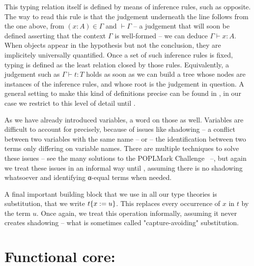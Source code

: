 \begin{marginfigure}
  \begin{mathpar}
  \label{rule:cic-var}
  \end{mathpar}
\end{marginfigure}

This typing relation itself is defined by means of inference rules,
such as  opposite. The way to read this rule is that the judgement
underneath the line follows from the one above,
\ie from $(x : A) \in \Gamma$
and $\vdash \Gamma$ – a judgement that will soon be defined asserting that the context
$\Gamma$ is well-formed – we can deduce $\Gamma \vdash x : A$.
When objects appear in the hypothesis but not the conclusion, they are implicitely
universally quantified.
Once a set of such inference rules is fixed,
typing is defined as the least relation closed by those
rules. Equivalently, a judgement such as $\Gamma \vdash t : T$
holds as soon as we can build a tree whose nodes are instances of the inference rules,
and whose root is the judgement in question. A general setting
to make this kind of definitions precise can be found in ,
in our case we restrict to this level of detail until .

As we have already introduced variables, a word on those as well. Variables are difficult
to account for precisely, because of issues like shadowing – a conflict between two variables
with the same name – or  – the identification between two terms
only differing on variable names. There are multiple techniques to solve these issues
– see the many solutions to the POPLMark Challenge~ –, 
but again we treat these issues in an informal way until , assuming
there is no shadowing whatsoever and identifying α-equal terms when needed.

A final important building block that we use in all our type theories is substitution,
that we write $\subs{t}{x}{u}$. This replaces every occurrence of $x$ in $t$ by the term
$u$. Once again, we treat this operation informally, assuming it never creates
shadowing – what is sometimes called "capture-avoiding" substitution.

\section{Functional core: }
\label{sec:tech-ccw}


